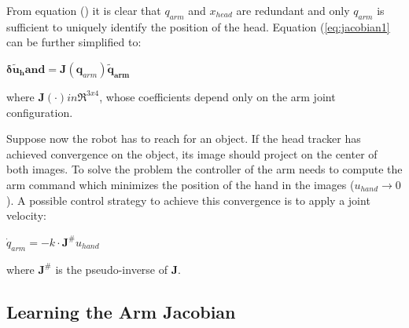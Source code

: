 From equation (\cite{eq:forward1}) it is clear that 
$q_{arm}$ and $x_{head}$ are redundant and only $q_{arm}$ is 
sufficient to uniquely identify the position of the head. Equation
(\ref{eq:jacobian1} can be further simplified to:
%
\begin{center} 
\begin{math}
\label{eq:jacobian3}
  \mathbf{\delta \tilde{u}_hand}=
  \mathbf J\left(\mathbf q_{arm}\right)
  \mathbf{\tilde{q}_{arm}}
\end{math}
\end{center}
%
where $\mathbf J(\cdot) in \mathbb \Re^{3x4}$, whose coefficients depend 
only on the arm joint configuration.

Suppose now the robot has to reach for an object. If the head tracker
has achieved convergence on the object, its image should project on 
the center of both images. To solve the problem the controller of the 
arm needs to compute the arm command which minimizes the position of the
hand in the images ($u_{hand} \rightarrow 0$). A possible control strategy
to achieve this convergence is to apply a joint velocity:
%
\begin{center}
\begin{math}
\dot q_{arm}=-k \cdot \mathbf J^{\#} u_{hand}
\end{math}
\end{center}
%
where $\mathbf J^{\#}$ is the pseudo-inverse of $\mathbf J$.

\subsection{Learning the Arm Jacobian}
%